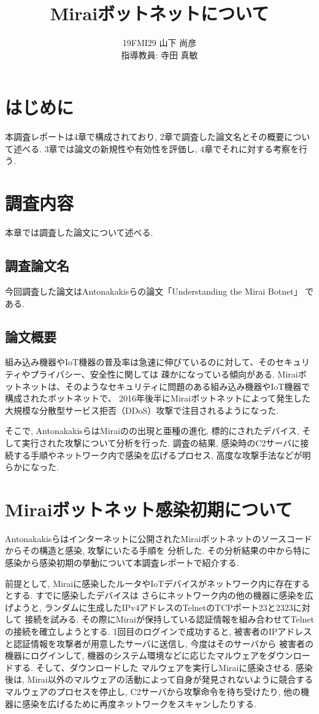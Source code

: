 \documentclass[twocolumn,9]{ltjsarticle}
\title{Miraiボットネットについて}
\author{19FMI29 山下 尚彦 \\ 指導教員: 寺田 真敏}
\date{}
\begin{document}
\maketitle

\section{はじめに}
本調査レポートは4章で構成されており, 2章で調査した論文名とその概要について述べる. 
3章では論文の新規性や有効性を評価し, 4章でそれに対する考察を行う. 

\section{調査内容}
本章では調査した論文について述べる. 

\subsection{調査論文名}
今回調査した論文はAntonakakisらの論文「Understanding the Mirai Botnet」
\cite{antonakakis2017understanding}である. 

\subsection{論文概要}
組み込み機器やIoT機器の普及率は急速に伸びているのに対して、そのセキュリティやプライバシー、安全性に関しては
疎かになっている傾向がある. 
Miraiボットネットは、そのようなセキュリティに問題のある組み込み機器やIoT機器で構成されたボットネットで、
2016年後半にMiraiボットネットによって発生した大規模な分散型サービス拒否（DDoS）攻撃で注目されるようになった.  

そこで, AntonakakisらはMiraiのの出現と亜種の進化, 標的にされたデバイス, そして実行された攻撃について分析を行った. 
調査の結果, 感染時のC2サーバに接続する手順やネットワーク内で感染を広げるプロセス, 高度な攻撃手法などが明らかになった. 

\section{Miraiボットネット感染初期について}
Antonakakisらはインターネットに公開されたMiraiボットネットのソースコードからその構造と感染, 攻撃にいたる手順を
分析した. その分析結果の中から特に感染から感染初期の挙動について本調査レポートで紹介する. 

前提として, Miraiに感染したルータやIoTデバイスがネットワーク内に存在するとする. すでに感染したデバイスは
さらにネットワーク内の他の機器に感染を広げようと, ランダムに生成したIPv4アドレスのTelnetのTCPポート23と2323に対して
接続を試みる. その際にMiraiが保持している認証情報を組み合わせてTelnetの接続を確立しようとする. 
1回目のログインで成功すると, 被害者のIPアドレスと認証情報を攻撃者が用意したサーバに送信し, 今度はそのサーバから
被害者の機器にログインして, 機器のシステム環境などに応じたマルウェアをダウンロードする. そして、ダウンロードした
マルウェアを実行しMiraiに感染させる. 
感染後は, Mirai以外のマルウェアの活動によって自身が発見されないように競合するマルウェアのプロセスを停止し, 
C2サーバから攻撃命令を待ち受けたり, 他の機器に感染を広げるために再度ネットワークをスキャンしたりする. 
\end{document}
